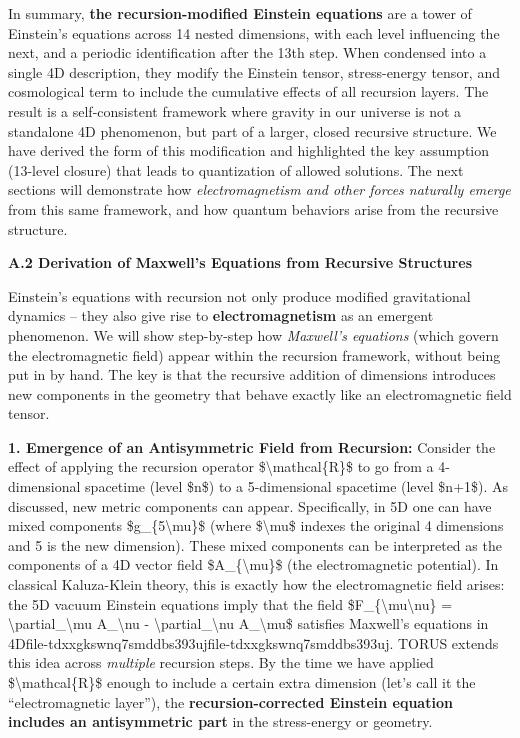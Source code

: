 \documentclass[
]{article}
\begin{document}
{In summary, \textbf{the recursion-modified Einstein equations} are a
tower of Einstein's equations across 14 nested dimensions, with each
level influencing the next, and a periodic identification after the 13th
step. When condensed into a single 4D description, they modify the
Einstein tensor, stress-energy tensor, and cosmological term to include
the cumulative effects of all recursion layers\hspace{0pt}. The result
is a self-consistent framework where gravity in our universe is not a
standalone 4D phenomenon, but part of a larger, closed recursive
structure. We have derived the form of this modification and highlighted
the key assumption (13-level closure) that leads to quantization of
allowed solutions. The next sections will demonstrate how
\emph{electromagnetism and other forces naturally emerge} from this same
framework, and how quantum behaviors arise from the recursive structure.

\textbf{A.2 Derivation of Maxwell's Equations from Recursive Structures}

Einstein's equations with recursion not only produce modified
gravitational dynamics -- they also give rise to
\textbf{electromagnetism} as an emergent phenomenon. We will show
step-by-step how \emph{Maxwell's equations} (which govern the
electromagnetic field) appear within the recursion framework, without
being put in by hand. The key is that the recursive addition of
dimensions introduces new components in the geometry that behave exactly
like an electromagnetic field tensor.

\textbf{1. Emergence of an Antisymmetric Field from Recursion:} Consider
the effect of applying the recursion operator
\$\textbackslash mathcal\{R\}\$ to go from a 4-dimensional spacetime
(level \$n\$) to a 5-dimensional spacetime (level \$n+1\$). As
discussed, new metric components can appear. Specifically, in 5D one can
have mixed components \$g\_\{5\textbackslash mu\}\$ (where
\$\textbackslash mu\$ indexes the original 4 dimensions and 5 is the new
dimension). These mixed components can be interpreted as the components
of a 4D vector field \$A\_\{\textbackslash mu\}\$ (the electromagnetic
potential). In classical Kaluza-Klein theory, this is exactly how the
electromagnetic field arises: the 5D vacuum Einstein equations imply
that the field \$F\_\{\textbackslash mu\textbackslash nu\} =
\textbackslash partial\_\textbackslash mu A\_\textbackslash nu -
\textbackslash partial\_\textbackslash nu A\_\textbackslash mu\$
satisfies Maxwell's equations in
4D\hspace{0pt}file-tdxxgkswnq7smddbs393uj\hspace{0pt}file-tdxxgkswnq7smddbs393uj.
TORUS extends this idea across \emph{multiple} recursion steps. By the
time we have applied \$\textbackslash mathcal\{R\}\$ enough to include a
certain extra dimension (let's call it the ``electromagnetic layer''),
the \textbf{recursion-corrected Einstein equation includes an
antisymmetric part} in the stress-energy or geometry.

}
\end{document}
